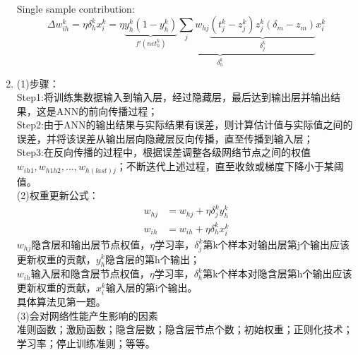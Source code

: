 \documentclass[a4paper,11pt,onecolumn,oneside,UTF8]{article}
\begin{document}
\begin{enumerate}
$$\begin{aligned}
              \end{aligned}
          $$
          Single sample contribution:
          $$
              \Delta w_{ih}^k =\eta\delta_h^kx_i^k  =\eta\underbrace{\underbrace{y_h^k\left(1-y_h^k\right)}_{f'\left(net_h^k\right)}\sum\limits_{j}w_{hj}\underbrace{\left(t_j^k-z_j^k\right)z_j^k\left(\delta_m-z_m\right)}_{\delta_j^k}}_{\delta_h^k}x_i^k
          $$
    \item
          (1)步骤：\\
          Step1:将训练集数据输入到输入层，经过隐藏层，最后达到输出层并输出结果，这是ANN的前向传播过程；\\
          Step2:由于ANN的输出结果与实际结果有误差，则计算估计值与实际值之间的误差，并将该误差从输出层向隐藏层反向传播，直至传播到输入层；\\
          Step3:在反向传播的过程中，根据误差调整各级网络节点之间的权值$w_{ih1},w_{h1h2},...,w_{h(last)j}$；不断迭代上述过程，直至收敛或梯度下降小于某阈值。\\
          (2)权重更新公式：\\
          $$
              \begin{aligned}
                  w_{hj} & =w_{hj}+\eta\delta_j^ky_h^k \\
                  w_{ih} & =w_{ih}+\eta\delta_h^kx_i^k
              \end{aligned}
          $$
          $w_{hj}$隐含层和输出层节点权值，$\eta$学习率，$\delta_j^k$第k个样本对输出层第j个输出应该更新权重的贡献，$y_h^k$隐含层的第h个输出；\\
          $w_{ih}$输入层和隐含层节点权值，$\eta$学习率，$\delta_h^k$第k个样本对隐含层第h个输出应该更新权重的贡献，$x_i^k$输入层的第i个输出。\\
          具体算法见第一题。\\
          (3)会对网络性能产生影响的因素\\
          准则函数；激励函数；隐含层数；隐含层节点个数；初始权重；正则化技术；学习率；停止训练准则；等等。
\end{enumerate}
\end{document}

